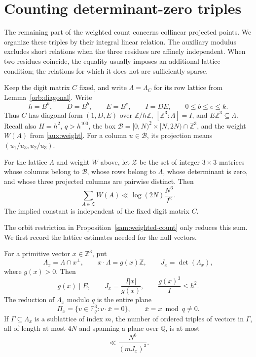 \section{Counting determinant-zero triples}\label{zero:section}

The remaining part of the weighted count concerns collinear projected
points.  We organize these triples by their integral linear relation.
The auxiliary modulus excludes short relations when the three residues
are affinely independent.  When two residues coincide, the equality
usually imposes an additional lattice condition; the relations for
which it does not are sufficiently sparse.

Keep the digit matrix $C$ fixed, and write $\Lambda=\Lambda_C$ for
its row lattice from Lemma~\ref{orb:diagonal}.  Write
\[
 h=B^k,\qquad D=B^b,\qquad E=B^e,\qquad I=DE,
 \qquad 0\le b\le e\le k.
\]
Thus $C$ has diagonal form $(1,D,E)$ over $\mathbb Z/h\mathbb Z$,
$[\mathbb Z^3:\Lambda]=I$, and $E\mathbb Z^3\subseteq\Lambda$.
Recall also $H=h^2$, $q>h^{100}$, the box
$\mathcal B=[0,N)^2\times[N,2N)\cap\mathbb Z^3$, and the weight
$W(A)$ from \eqref{aux:weight}.  For a column $u\in\mathcal B$, its
projection means $(u_1/u_3,u_2/u_3)$.

\begin{proposition}\label{zero:weighted-zero}
For the lattice $\Lambda$ and weight $W$ above, let $\mathcal Z$ be
the set of integer $3\times3$ matrices whose columns belong to
$\mathcal B$, whose rows belong to $\Lambda$, whose determinant is
zero, and whose three projected columns are pairwise distinct.  Then
\begin{equation}\label{zero:target}
 \sum_{A\in\mathcal Z}W(A)
 \ll \log(2N)\frac{N^6}{I^2}.
\end{equation}
The implied constant is independent of the fixed digit matrix $C$.
\end{proposition}

The orbit restriction in Proposition~\ref{sam:weighted-count} only
reduces this sum.  We first record the lattice estimates needed for
the null vectors.

\begin{lemma}\label{zero:plane}
For a primitive vector $x\in\mathbb Z^3$, put
\[
 \Lambda_x=\Lambda\cap x^\perp,\qquad
 x\cdot\Lambda=g(x)\mathbb Z,\qquad
 J_x=\det(\Lambda_x),
\]
where $g(x)>0$.  Then
\begin{equation}\label{zero:plane-data}
 g(x)\mid E,\qquad J_x=\frac{I|x|}{g(x)},\qquad
 \frac{g(x)^3}{I}\le h^2.
\end{equation}
The reduction of $\Lambda_x$ modulo $q$ is the entire plane
\[
 \Pi_x=\{v\in\mathbb F_q^3:v\cdot\bar x=0\},
 \qquad \bar x=x\bmod q\ne0.
\]
If $\Gamma\subseteq\Lambda_x$ is a sublattice of index $m$, the
number of ordered triples of vectors in $\Gamma$, all of length at
most $4N$ and spanning a plane over $\mathbb Q$, is at most
\begin{equation}\label{zero:row-count}
 \ll \frac{N^6}{(mJ_x)^3}.
\end{equation}
\end{lemma}

